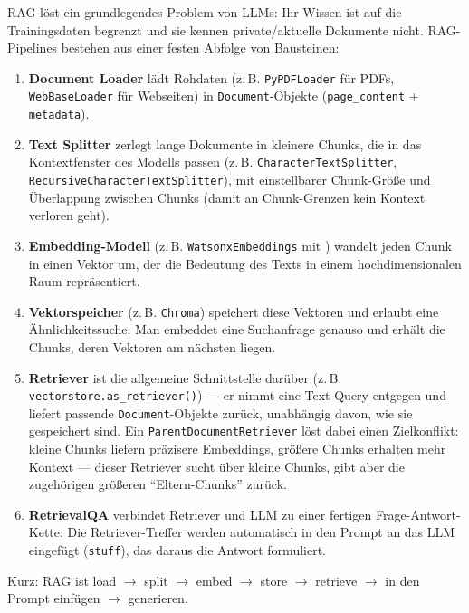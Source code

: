 RAG löst ein grundlegendes Problem von LLMs: Ihr Wissen ist auf die Trainingsdaten
begrenzt und sie kennen private/aktuelle Dokumente nicht. RAG-Pipelines bestehen aus
einer festen Abfolge von Bausteinen:
\begin{enumerate}
    \item \textbf{Document Loader} lädt Rohdaten (z.\,B. \texttt{PyPDFLoader} für PDFs,
          \texttt{WebBaseLoader} für Webseiten) in \texttt{Document}-Objekte
          (\texttt{page\_content} + \texttt{metadata}).
    \item \textbf{Text Splitter} zerlegt lange Dokumente in kleinere Chunks, die in das
          Kontextfenster des Modells passen (z.\,B. \texttt{CharacterTextSplitter},
          \texttt{RecursiveCharacterTextSplitter}), mit einstellbarer Chunk-Größe und
          Überlappung zwischen Chunks (damit an Chunk-Grenzen kein Kontext verloren geht).
    \item \textbf{Embedding-Modell} (z.\,B. \texttt{WatsonxEmbeddings} mit
          \texttt{}) wandelt jeden Chunk in einen
          Vektor um, der die Bedeutung des Texts in einem hochdimensionalen Raum
          repräsentiert.
    \item \textbf{Vektorspeicher} (z.\,B. \texttt{Chroma}) speichert diese Vektoren und
          erlaubt eine Ähnlichkeitssuche: Man embeddet eine Suchanfrage genauso und
          erhält die Chunks, deren Vektoren am nächsten liegen.
    \item \textbf{Retriever} ist die allgemeine Schnittstelle darüber (z.\,B.
          \texttt{vectorstore.as\_retriever()}) --- er nimmt eine Text-Query entgegen und
          liefert passende \texttt{Document}-Objekte zurück, unabhängig davon, wie sie
          gespeichert sind. Ein \texttt{ParentDocumentRetriever} löst dabei einen
          Zielkonflikt: kleine Chunks liefern präzisere Embeddings, größere Chunks
          erhalten mehr Kontext --- dieser Retriever sucht über kleine Chunks, gibt aber
          die zugehörigen größeren \enquote{Eltern-Chunks} zurück.
    \item \textbf{RetrievalQA} verbindet Retriever und LLM zu einer fertigen
          Frage-Antwort-Kette: Die Retriever-Treffer werden automatisch in den Prompt an
          das LLM eingefügt (\texttt{stuff}), das daraus die Antwort formuliert.
\end{enumerate}
Kurz: RAG ist load $\rightarrow$ split $\rightarrow$ embed $\rightarrow$ store
$\rightarrow$ retrieve $\rightarrow$ in den Prompt einfügen $\rightarrow$ generieren.

